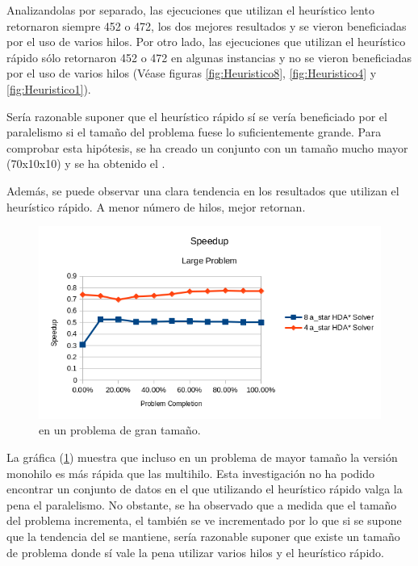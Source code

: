 Analizandolas por separado, las ejecuciones que utilizan el heurístico lento
retornaron siempre 452 o 472, los dos mejores resultados y se vieron
beneficiadas por el uso de varios hilos.
Por otro lado, las ejecuciones que utilizan el heurístico rápido
sólo retornaron 452 o 472 en algunas instancias y no se vieron
beneficiadas por el uso de varios hilos
(Véase figuras \ref{fig:Heuristico8}, \ref{fig:Heuristico4} y \ref{fig:Heuristico1}).

Sería razonable suponer que el heurístico rápido
sí se vería beneficiado por el paralelismo si el tamaño del
problema fuese lo suficientemente grande.
Para comprobar esta hipótesis, se ha creado un conjunto
con un tamaño mucho mayor (70x10x10) y se ha obtenido el .

Además, se puede observar una clara tendencia en los resultados que utilizan
el heurístico rápido. A menor número de hilos, mejor  retornan.

\begin{figure}[h]
    \centering
    \includegraphics[width=\textwidth]{Media/Ch2/Speedup_Large_Problem.png}
    \caption{ en un problema de gran tamaño.}
    \label{fig:Speedup_Large_Problem}
\end{figure}

La gráfica (\ref{fig:Speedup_Large_Problem}) muestra que incluso en un problema de mayor tamaño
la versión monohilo es más rápida que las multihilo.
Esta investigación no ha podido encontrar un conjunto de datos
en el que utilizando el heurístico rápido valga la pena el paralelismo.
No obstante, se ha observado que a medida que el tamaño
del problema incrementa, el  también se ve incrementado
por lo que si se supone que la tendencia del 
se mantiene, sería razonable suponer que existe un tamaño de
problema donde sí vale la pena utilizar varios hilos y 
el heurístico rápido.

